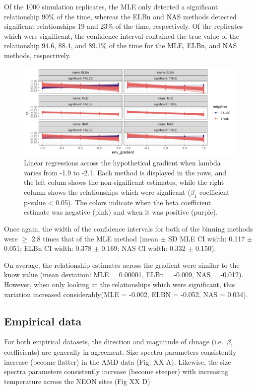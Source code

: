 \documentclass[
]{article}
\begin{document}
Of the 1000 simulation replicates, the MLE only detected a significant
relationship 90\% of the time, whereas the ELBn and NAS methods detected
significant relationships 19 and 23\% of the time, respectively. Of the
replicates which were significant, the confidence interval contained the
true value of the relationship 94.6, 88.4, and 89.1\% of the time for
the MLE, ELBn, and NAS methods, respectively.

\begin{figure}
\centering
\includegraphics{figures/small_lambda_spaghetti.png}
\caption{Linear regressions across the hypothetical gradient when lambda
varies from -1.9 to -2.1. Each method is displayed in the rows, and the
left colum shows the non-significant estimates, while the right column
shows the relationships which were signficant (\(\beta_1\) coefficient
p-value \textless{} 0.05). The colors indicate when the beta coefficient
estimate was negative (pink) and when it was positive (purple).}
\end{figure}

Once again, the width of the confidence intervals for both of the
binning methods were \(\ge\) 2.8 times that of the MLE method (mean
\(\pm\) SD MLE CI width: 0.117 \(\pm\) 0.051; ELBn CI width: 0.378
\(\pm\) 0.169; NAS CI width: 0.332 \(\pm\) 0.150).

On average, the relationship estimates across the gradient were similar
to the know value (mean deviation: MLE = 0.00001, ELBn = -0.009, NAS =
-0.012). However, when only looking at the relationships which were
significant, this variation increased considerably(MLE = -0.002, ELBN =
-0.052, NAS = 0.034).

\hypertarget{empirical-data-1}{%
\subsection{Empirical data}\label{empirical-data-1}}

For both empirical datasets, the direction and magnitude of chnage
(i.e.~\(\beta_1\) coefficients) are generally in agreement. Size spectra
parameters consistently increase (become flatter) in the AMD data (Fig.
XX A). Likewise, the size spectra parameters consistently increase
(become steeper) with increasing temperature across the NEON sites (Fig
XX D)
\end{document}
